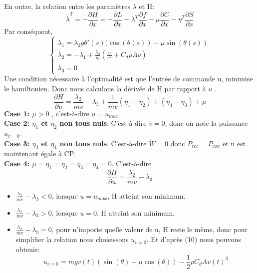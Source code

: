 \documentclass[lettersize,journal]{IEEEtran}
\begin{document}
En outre, la relation entre les paramètres $\lambda$ et H:
\begin{equation}
    \dot{\lambda}^{T} = -\frac{\partial H}{\partial x} = -\frac{\partial L}{\partial x} - \lambda^{T}\frac{\partial f}{\partial x} - \mu \frac{\partial C}{\partial x} - \eta^{T}\frac{\partial S}{\partial x}
\end{equation}
Par conséquent, 
\begin{equation}
    \begin{cases}
        \dot{\lambda_{1}} = \lambda_{2}g\theta'(s)(\cos(\theta(s)) - \mu \sin(\theta(s))\\
        \dot{\lambda_{2}} = -\lambda_1 + \frac{\lambda_2}{m} (\frac{u}{v^2}+C_{d}\rho A v)\\
        \dot{\lambda_{3}} = 0
    \end{cases}
\end{equation}
Une condition nécessaire à l’optimalité est que l’entrée de commande u, minimise le hamiltonien.
Donc nous calculons la dérivée de H par rapport à $u$ .
\begin{equation}
    \frac{\partial H}{\partial u } = \frac{\lambda_{2}}{mv}-\lambda_{3}+\frac{1}{mv}(\eta_1-\eta_2)+(\eta_4-\eta_3)+\mu
\end{equation}
\textbf{Case 1: $\mu > 0$} , c'est-à-dire $u = u_{max}$\\
\textbf{Case 2: $\eta_1$ et $\eta_2$ non tous nuls}. C'est-à-dire  $\dot{v} = 0$, donc on note la puissance $u_{\dot{v}=0}$.\\
\textbf{Case 3: $\eta_3$ et $\eta_4$ non tous nuls}.  C'est-à-dire $\dot{W} = 0$ donc $P_{rec} = P_{con}$ et u est maintenant égale à CP.\\
\textbf{Case 4: $\mu = \eta_1 = \eta_2 = \eta_3 = \eta_4 = 0 $}. C'est-à-dire 
\begin{equation}
    \frac{\partial H}{\partial u } = \frac{\lambda_{2}}{mv}-\lambda_{3}
\end{equation}
\begin{itemize}
    \item $\frac{\lambda_{2}}{mv}-\lambda_{3} < 0$, lorsque $u = u_{max}$, H atteint son minimum.
    \item  $\frac{\lambda_{2}}{mv}-\lambda_{3} > 0$, lorsque $u = 0$, H atteint son minimum.
    \item $\frac{\lambda_{2}}{mv}-\lambda_{3} = 0$, pour n'importe quelle valeur de u, H reste le même, donc pour simplifier la relation nous choisissons $u_{\dot{v}=0}$. Et d'après (10) nous pouvons obtenir:
    \begin{equation}
        u_{\dot{v}=0} =mgv(t)(\sin (\theta)+ \mu \cos (\theta))-\frac{1}{2}\rho C_{d}A v(t)^{3}
    \end{equation}
\end{itemize}
\end{document}
